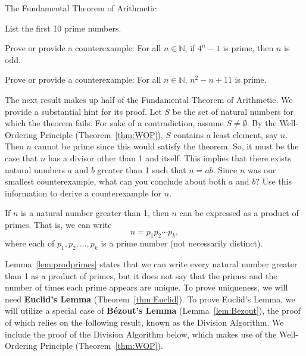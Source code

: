 \begin{section}{The Fundamental Theorem of Arithmetic}
\begin{problem}
List the first 10 prime numbers.
\end{problem}

\begin{problem}
Prove or provide a counterexample:  For all $n\in\mathbb{N}$, if $4^n-1$ is prime, then $n$ is odd.
\end{problem}

\begin{problem}
Prove or provide a counterexample:  For all $n\in\mathbb{N}$, $n^2-n+11$ is prime.
\end{problem}

The next result makes up half of the Fundamental Theorem of Arithmetic. We provide a substantial hint for its proof. Let $S$ be the set of natural numbers for which the theorem fails.  For sake of a contradiction, assume $S\neq \emptyset$.  By the Well-Ordering Principle (Theorem~\ref{thm:WOP}), $S$ contains a least element, say $n$. Then $n$ cannot be prime since this would satisfy the theorem.  So, it must be the case that $n$ has a divisor other than 1 and itself.  This implies that there exists natural numbers $a$ and $b$ greater than 1 such that $n=ab$.  Since $n$ was our smallest counterexample, what can you conclude about both $a$ and $b$?  Use this information to derive a counterexample for $n$.

\begin{lemma}\label{lem:prodprimes}
If $n$ is a natural number greater than 1, then $n$ can be expressed as a product of primes.  That is, we can write
\[
n=p_1 p_2 \cdots p_k,
\]
where each of $p_1, p_2, \ldots, p_k$ is a prime number (not necessarily distinct).
\end{lemma}

Lemma~\ref{lem:prodprimes} states that we can write every natural number greater than 1 as a product of primes, but it does not say that the primes and the number of times each prime appears are unique.  To prove uniqueness, we will need \textbf{Euclid's Lemma} (Theorem~\ref{thm:Euclid}). To prove Euclid's Lemma, we will utilize a special case of \textbf{B\'ezout's Lemma} (Lemma~\ref{lem:Bezout}), the proof of which relies on the following result, known as the Division Algorithm. We include the proof of the Division Algorithm below, which makes use of the Well-Ordering Principle (Theorem~\ref{thm:WOP}). %


\end{section}
